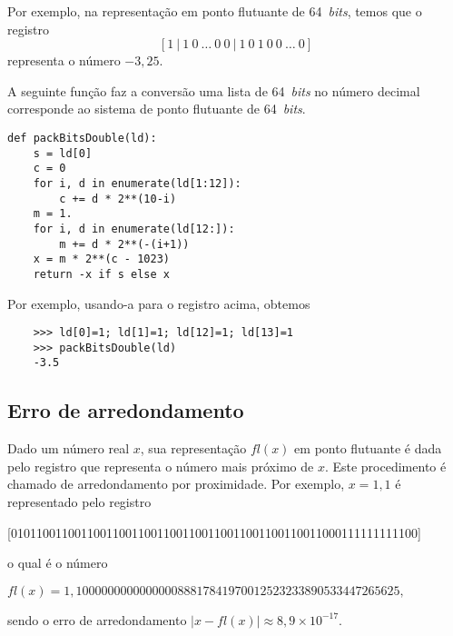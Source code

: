 \begin{ex}
  Por exemplo, na representação em ponto flutuante de 64~{\it bits}, temos que o registro
  \begin{equation}\label{eq:regfloat64}
    [1 ~ | ~ 1 ~ 0 ~ \ldots ~ 0 ~ 0 ~ | ~ 1 ~ 0 ~ 1 ~ 0 ~ 0 ~ \ldots ~ 0]
  \end{equation}
  representa o número $-3,25$.

  \ifispython
  A seguinte função faz a conversão  uma lista de 64~{\it bits} no número decimal corresponde ao sistema de ponto flutuante de 64~{\it bits}.
  \begin{lstlisting}[caption=packBitsDouble.py, label=py:packBitsDouble]
    def packBitsDouble(ld):
    s = ld[0]
    c = 0
    for i, d in enumerate(ld[1:12]):
        c += d * 2**(10-i)
    m = 1.
    for i, d in enumerate(ld[12:]):
        m += d * 2**(-(i+1))
    x = m * 2**(c - 1023)
    return -x if s else x
  \end{lstlisting}
  Por exemplo, usando-a para o registro acima, obtemos
  \begin{lstlisting}
    >>> ld[0]=1; ld[1]=1; ld[12]=1; ld[13]=1
    >>> packBitsDouble(ld)
    -3.5
  \end{lstlisting}
  \fi
\end{ex}

\subsection{Erro de arredondamento}

Dado um número real $x$, sua representação $fl(x)$ em ponto flutuante é dada pelo registro que representa o número mais próximo de $x$. Este procedimento é chamado de arredondamento por proximidade. Por exemplo, $x = 1,1$ é representado pelo registro
\begin{small}
  \begin{center}
    [0101100110011001100110011001100110011001100110011000111111111100]
  \end{center}
\end{small}
o qual é o número 
\begin{small}
  \begin{center}
    $fl(x) = 1,100000000000000088817841970012523233890533447265625,$
  \end{center}
\end{small}
sendo o erro de arredondamento $|x - fl(x)| \approx 8,9\times 10^{-17}$.

